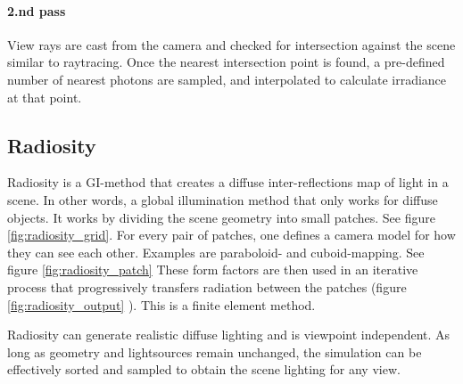 		\paragraph{2.nd pass} View rays are cast from the camera and checked for intersection against the scene similar to raytracing. Once the nearest intersection point is found, a pre-defined number of nearest photons are sampled, and interpolated to calculate irradiance at that point.
			
	\subsection {Radiosity}
		Radiosity is a GI-method that creates a diffuse inter-reflections map of light in a scene. In other words, a global illumination method that only works for diffuse objects. It works by dividing the scene geometry into small
		patches. See figure \ref{fig:radiosity_grid}. For every pair of patches, one defines a camera model for how they can
		see each other. Examples are paraboloid- and cuboid-mapping. See figure \ref{fig:radiosity_patch} These form factors are then used
		in an iterative process that progressively transfers radiation between the patches (figure \ref{fig:radiosity_output} ). This is a finite element method.

		Radiosity can generate realistic diffuse lighting and is viewpoint independent. As long as
		geometry and lightsources remain unchanged, the simulation can be effectively
		sorted and sampled to obtain the scene lighting for any view.

